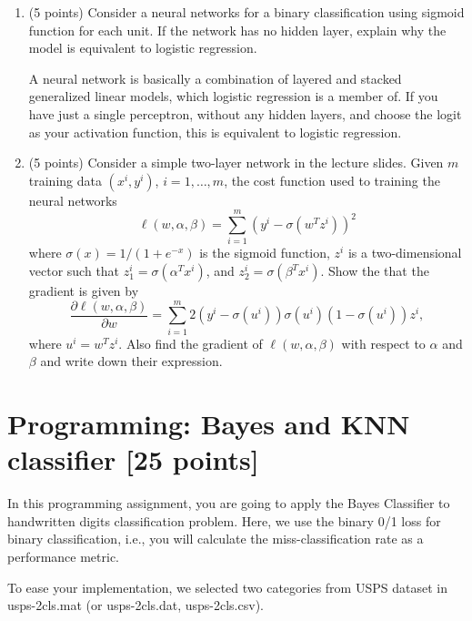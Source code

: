 \documentclass[a4paper,12pt,fleqn]{article}
\begin{document}
\begin{enumerate}
\item (5 points)
Consider a neural networks for a binary classification using sigmoid function for each unit. If the network has no hidden layer, explain why the model is equivalent to logistic regression. 

\vspace{.15in}
A neural network is basically a combination of layered and stacked generalized linear models, which logistic regression is a member of.  If you have just a single perceptron, without any hidden layers, and choose the logit as your activation function, this is equivalent to logistic regression.

\vspace{.15in}


\item (5 points) 
Consider a simple two-layer network in the lecture slides. Given $m$ training data $(x^i, y^i)$, $i = 1, \ldots, m$, the cost function used to training the neural networks
\[
\ell(w, \alpha, \beta) = \sum_{i=1}^m (y^i - \sigma(w^T z^i))^2
\]
where $\sigma (x) = 1/(1+e^{-x})$ is the sigmoid function, $z^i$ is a two-dimensional vector such that  $z_1^i = \sigma(\alpha^T x^i)$, and $z_2^i = \sigma(\beta^T x^i)$. Show the that the gradient is given by
\[
\frac{\partial \ell(w, \alpha, \beta) }{\partial w}
= \sum_{i=1}^m 2(y^i - \sigma(u^i))\sigma(u^i)(1-\sigma(u^i)) z^i,
\]
where $u^i = w^T z^i$. Also find the gradient of $\ell(w, \alpha, \beta)$ with respect to $\alpha$ and $\beta$ and write down their expression.
\end{enumerate}
\vspace{.15in}

\vspace{.15in}
\clearpage

\section{Programming: Bayes and KNN classifier [25 points]}


In this programming assignment, you are going to apply the Bayes Classifier to handwritten digits classification problem. Here, we use the binary 0/1 loss for binary classification, i.e., you will calculate the miss-classification rate as a performance metric.

To ease your implementation, we selected two categories from USPS dataset in \textsf{usps-2cls.mat} (or \textsf{usps-2cls.dat}, \textsf{usps-2cls.csv}).
\end{document}
